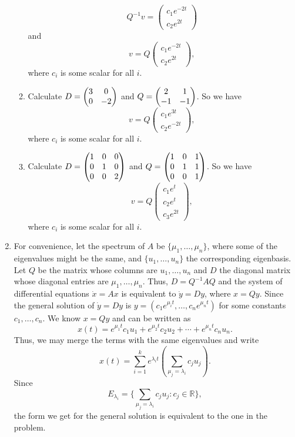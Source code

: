 \begin{enumerate}
\begin{enumerate}
\[Q^{-1}v=\begin{pmatrix}c_1e^{-2t}\\c_2e^{2t}\end{pmatrix}\]
and
\[v=Q\begin{pmatrix}c_1e^{-2t}\\c_2e^{2t}\end{pmatrix},\]
where $c_i$ is some scalar for all $i$.
\item Calculate $D=\begin{pmatrix}3 & 0\cr 0 & -2\end{pmatrix}$ and $Q=\begin{pmatrix}2 & 1\cr -1 & -1\end{pmatrix}$. So we have 
\[v=Q\begin{pmatrix}c_1e^{3t}\\c_2e^{-2t}\end{pmatrix},\]
where $c_i$ is some scalar for all $i$.
\item Calculate $D=\begin{pmatrix}1 & 0 & 0\cr 0 & 1 & 0\cr 0 & 0 & 2\end{pmatrix}$ and $Q=\begin{pmatrix}1 & 0 & 1\cr 0 & 1 & 1\cr 0 & 0 & 1\end{pmatrix}$. So we have 
\[v=Q\begin{pmatrix}c_1e^{t}\\c_2e^{t}\\c_3e^{2t}\end{pmatrix},\]
where $c_i$ is some scalar for all $i$.
\end{enumerate}
\item For convenience, let the spectrum of $A$ be $\{\mu_1,\ldots, \mu_n\}$, where some of the eigenvalues might be the same, and $\{u_1, \ldots, u_n\}$ the corresponding eigenbasis.  Let $Q$ be the matrix whose columns are $u_1,\ldots, u_n$ and $D$ the diagonal matrix whose diagonal entries are $\mu_1, \ldots, \mu_n$.  Thus, $D = Q^{-1}AQ$ and the system of differential equations $\dot{x} = A x$ is equivalent to $\dot{y} = D y$, where $x = Qy$.  Since the general solution of $\dot{y} = D y$ is $y = (c_1e^{\mu_it}, \ldots, c_ne^{\mu_nt})$ for some constants $c_1, \ldots, c_n$.  We know $x = Qy$ and can be written as  
\[
    x(t) = e^{\mu_1t}c_1u_1 + e^{\mu_2t}c_2u_2 + \cdots + e^{\mu_nt}c_nu_n.
\]
Thus, we may merge the terms with the same eigenvalues and write
\[
    x(t) = \sum_{i=1}^k e^{\lambda_it}\left(\sum_{\mu_j = \lambda_i} c_ju_j\right).
\]
Since 
\[
    E_{\lambda_i} = \{\sum_{\mu_j = \lambda_i} c_ju_j : c_j\in\mathbb{R} \},
\]
the form we get for the general solution is equivalent to the one in the problem.  


\end{enumerate}
